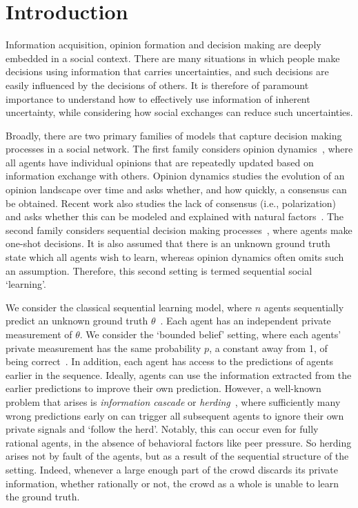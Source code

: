\section{Introduction}

Information acquisition, opinion formation and decision making are deeply embedded in a social context.
There are many situations in which people make decisions using information that carries uncertainties, and such decisions are easily influenced by the decisions of others. It is therefore of paramount importance to understand how to effectively use information of inherent uncertainty, while considering how social exchanges can reduce such uncertainties.

Broadly, there are two primary families of models that capture decision making processes in a social network. The first family considers opinion dynamics~\cite{Mossel2017-sd, Acemoglu2011-tx}, where all agents have individual opinions that are repeatedly updated based on information exchange with others. Opinion dynamics studies the evolution of an opinion landscape over time and asks whether, and how quickly, a consensus can be obtained. Recent work also studies the lack of consensus (i.e., polarization) and asks whether this can be modeled and explained with natural factors~\cite{Wang2022-uy}. The second family considers sequential decision making processes~\cite{Golub2017-qo,Mobius2014-oy}, where agents make one-shot decisions. It is also assumed that there is an unknown ground truth state which all agents wish to learn, whereas opinion dynamics often omits such an assumption. Therefore, this second setting is termed sequential social `learning'. 

We consider the classical sequential learning model, where $n$ agents sequentially predict an unknown ground truth $\theta$~\cite{Jadbabaie2012-ob,Mossel2014-mv}. Each agent has an independent private measurement of $\theta$. We consider the `bounded belief' setting, where each agents' private measurement has the same probability $p$, a constant away from 1, of being correct~\cite{Smith2000-wk,Acemoglu2011-vj}.
In addition, each agent has access to the predictions of agents earlier in the sequence. Ideally, agents can use the information extracted from the earlier predictions to improve their own prediction. However, a well-known problem that arises is \emph{information cascade} or \emph{herding}~\cite{Banerjee1992-ra,Bikhchandani1992-rs,Welch1992-yt,Smith2000-wk,Chamley2004-or}, where sufficiently many wrong predictions early on can trigger all subsequent agents to ignore their own private signals and `follow the herd'. Notably, this can occur even for fully rational agents, in the absence of behavioral factors like peer pressure. So herding arises not by fault of the agents, but as a result of the sequential structure of the setting. Indeed, whenever a large enough part of the crowd discards its private information, whether rationally or not, the crowd as a whole is unable to learn the ground truth. 

